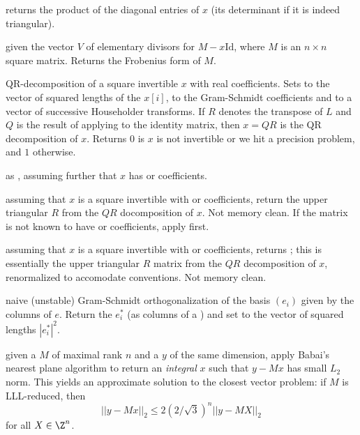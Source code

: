  returns the product of the diagonal
entries of $x$ (its determinant if it is indeed triangular).

 given the vector $V$ of elementary
divisors for $M - x\text{Id}$, where $M$ is an $n\times n$ square matrix.
Returns the Frobenius form of $M$.

QR-decomposition of a square invertible  $x$ with real coefficients.
Sets  to the vector of squared lengths of the $x[i]$,  to
the Gram-Schmidt coefficients and  to a vector of successive
Householder transforms. If $R$ denotes the transpose of $L$ and $Q$ is the
result of applying  to the identity matrix, then $x = QR$ is the QR
decomposition of $x$. Returns $0$ is $x$ is not invertible or we hit a
precision problem, and $1$ otherwise.

 as
, assuming further that $x$ has  or 
coefficients.

 assuming that $x$ is a square
invertible  with  or  coefficients, return
the upper triangular $R$ from the $QR$ docomposition of $x$. Not memory
clean. If the matrix is not known to have  or 
coefficients, apply  first.

 assuming that $x$ is a square
invertible  with  or  coefficients, returns
; this is essentially the upper triangular $R$
matrix from the $QR$ decomposition of $x$, renormalized to accomodate
 conventions. Not memory clean.

 naive (unstable) Gram-Schmidt
orthogonalization of the basis $(e_i)$ given by the columns of  $e$.
Return the $e_i^*$ (as columns of a ) and set  to the
vector of squared lengths $|e_i^*|^2$.

 given a  $M$ of maximal rank $n$
and a  $y$ of the same dimension, apply Babai's nearest plane
algorithm to return an \emph{integral} $x$ such that $y - Mx$ has small $L_2$
norm. This yields an approximate solution to the closest vector problem: if
$M$ is LLL-reduced, then
$$|| y - Mx ||_2 \leq 2 (2/\sqrt{3})^n || y - MX ||_2$$
for all $X \in \Z^n$.

